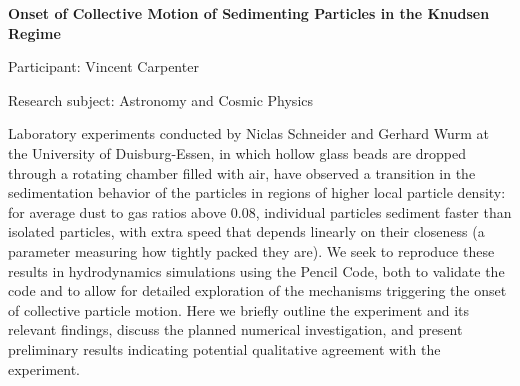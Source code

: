 \hfill 

\begin{minipage}[t]{1.0\textwidth}

\begin{center}

{{\large\bfseries Onset of Collective Motion of Sedimenting Particles in the Knudsen Regime}\par}

\end{center}

{\noindent Participant: Vincent Carpenter\par} 

{\noindent Research subject: Astronomy and Cosmic Physics\par}\medskip

\noindent Laboratory experiments conducted by Niclas Schneider and Gerhard Wurm at the University of Duisburg-Essen, in which hollow glass beads are dropped through a rotating chamber filled with air, have observed a transition in the sedimentation behavior of the particles in regions of higher local particle density: for average dust to gas ratios above 0.08, individual particles sediment faster than isolated particles, with extra speed that depends linearly on their closeness (a parameter measuring how tightly packed they are). We seek to reproduce these results in hydrodynamics simulations using the Pencil Code, both to validate the code and to allow for detailed exploration of the mechanisms triggering the onset of collective particle motion. Here we briefly outline the experiment and its relevant findings, discuss the planned numerical investigation, and present preliminary results indicating potential qualitative agreement with the experiment.\par\end{minipage}

\hfill 

